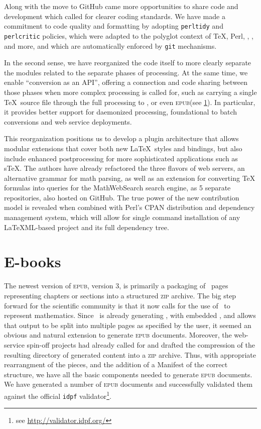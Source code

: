 \documentclass{llncs}
\def\ebooks{\mbox{E-books}\xspace}
\def\epub{\textsc{epub}\xspace}
\def\zip{\textsc{zip}\xspace}
\begin{document}
Along with the move to GitHub came more opportunities to share
code and development which called for clearer coding standards.
We have made a commitment to code quality and formatting by
adopting \texttt{perltidy} and \texttt{perlcritic} policies,
which were adapted to the polyglot context of \TeX, Perl, \XML,
\XSLT, and more, and which are automatically enforced by \texttt{git} mechanisms.

In the second sense, we have reorganized the code itself to more clearly
separate the modules related to the separate phases of processing.
At the same time, we enable ``conversion as an API'', offering a connection and code sharing between those phases when more
complex processing is called for, such as carrying a single \TeX\ source
file through the full processing to \HTML, or even \epub (see \ref{ebooks}).
In particular, it provides better support for daemonized processing, foundational to batch conversions and web service deployments.

This reorganization positions us to develop a plugin architecture that allows modular extensions
that cover both new \LaTeX\ styles and bindings, but also
include enhanced postprocessing for more sophisticated applications
such as s\TeX. The authors have already refactored the three flavors of {\LaTeXML} web servers, an alternative grammar for math parsing,
as well as an extension for converting {\TeX} formulas into queries for the MathWebSearch search engine, as 5 separate repositories, also hosted on GitHub.
The true power of the new contribution model is revealed when combined with Perl's CPAN distribution and dependency management system,
 which will allow for single command installation of any LaTeXML-based project and its full dependency tree.

\section{\ebooks}\label{ebooks}
The newest version of \epub, version 3, is primarily a packaging
of \HTML\ pages representing chapters or sections into a structured
\zip archive. The big step forward for the scientific community
is that it now calls for the use of \MathML\
to represent mathematics. Since \LaTeXML\ is already generating \HTML,
with embedded \MathML, and allows that output to be split into
multiple pages as specified by the user, it seemed an obvious
and natural extension to generate \epub documents. Moreover, the
web-service spin-off projects had already called for and drafted the compression of the resulting
directory of generated content into a \zip
archive.  Thus, with appropriate rearrangment of the pieces,
and the addition of a Manifest of the correct structure,
we have all the basic components needed to generate \epub documents. We have generated a number of \epub documents and successfully validated them against the official \texttt{idpf} validator\footnote{see \url{http://validator.idpf.org/}}.
\end{document}

